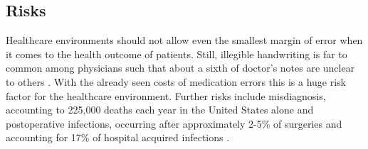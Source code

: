 \subsection{Risks}
Healthcare environments should not allow even the smallest margin of error when it comes to the health outcome of patients. Still, illegible handwriting is far to common among physicians such that about a sixth of doctor's notes are unclear to others \cite{rodriguez2002illegible}. With the already seen costs of medication errors this is a huge risk factor for the healthcare environment. Further risks include misdiagnosis, accounting to 225,000 deaths each year in the United States alone \cite{gregerIatrogenic} and postoperative infections, occurring after approximately 2-5\% of surgeries and accounting for 17\% of hospital acquired infections \cite{andreu2015wearable}.

